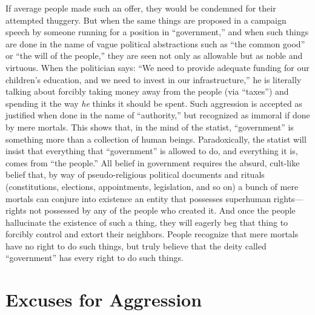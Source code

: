 \documentclass{book}
\begin{document}
If average people made such an offer, they would be condemned for their attempted thuggery. But when the same things are proposed in a campaign speech by someone running for a position in \enquote{government,} and when such things are done in the name of vague political abstractions such as \enquote{the common good} or \enquote{the will of the people,} they are seen not only as allowable but as noble and virtuous. When the politician says: \enquote{We need to provide adequate funding for our children's education, and we need to invest in our infrastructure,} he is literally talking about forcibly taking money away from the people (via \enquote{taxes}) and spending it the way \emph{he} thinks it should be spent. Such aggression is accepted as justified when done in the name of \enquote{authority,} but recognized as immoral if done by mere mortals. This shows that, in the mind of the statist, \enquote{government} is something more than a collection of human beings. Paradoxically, the statist will insist that everything that \enquote{government} is allowed to do, and everything it is, comes from \enquote{the people.} All belief in government requires the absurd, cult-like belief that, by way of pseudo-religious political documents and rituals (constitutions, elections, appointments, legislation, and so on) a bunch of mere mortals can conjure into existence an entity that possesses superhuman rights---rights not possessed by any of the people who created it. And once the people hallucinate the existence of such a thing, they will eagerly beg that thing to forcibly control and extort their neighbors. People recognize that mere mortals have no right to do such things, but truly believe that the deity called \enquote{government} has every right to do such things.

\section{Excuses for Aggression}
\end{document}
